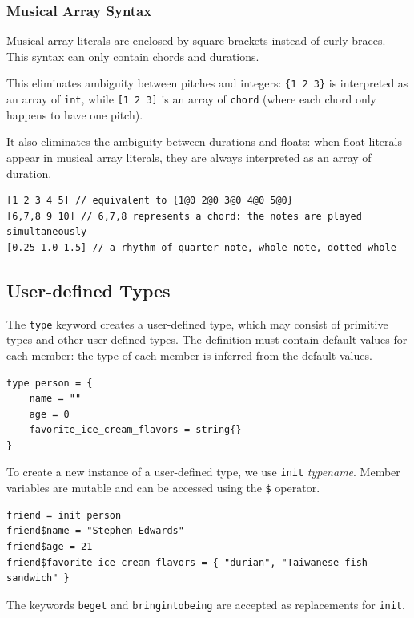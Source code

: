 \documentclass[11pt, onecolumn, letterpaper]{article}
\begin{document}
\subsubsection {Musical Array Syntax}
Musical array literals are enclosed by square brackets instead of curly braces. This syntax can only contain chords and durations. 

This eliminates ambiguity between pitches and integers: \texttt{\{1 2 3\}} is interpreted as an array of \texttt{int}, while \texttt{[1 2 3]} is an array of \texttt{chord} (where each chord only happens to have one pitch).

It also eliminates the ambiguity between durations and floats: when float literals appear in musical array literals, they are always interpreted as an array of duration.

\begin{lstlisting}
[1 2 3 4 5] // equivalent to {1@0 2@0 3@0 4@0 5@0}
[6,7,8 9 10] // 6,7,8 represents a chord: the notes are played simultaneously 
[0.25 1.0 1.5] // a rhythm of quarter note, whole note, dotted whole
\end{lstlisting}

\subsection {User-defined Types}
The \texttt{type} keyword creates a user-defined type, which may consist of primitive types and other user-defined types. The definition must contain default values for each member: the type of each member is inferred from the default values.

\begin{lstlisting}
type person = {
    name = ""
    age = 0
    favorite_ice_cream_flavors = string{}
}
\end{lstlisting}

To create a new instance of a user-defined type, we use \texttt{init} \textit{typename}. Member variables are mutable and can be accessed using the \texttt{\$} operator.

\begin{lstlisting}
friend = init person
friend$name = "Stephen Edwards"
friend$age = 21
friend$favorite_ice_cream_flavors = { "durian", "Taiwanese fish sandwich" }
\end{lstlisting}

The keywords \texttt{beget} and \texttt{bringintobeing} are accepted as replacements for \texttt{init}.
\end{document}
